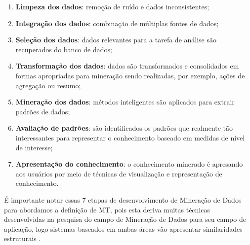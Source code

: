     \begin{enumerate}
        \item \textbf{Limpeza dos dados}: remoção de ruído e dados inconsistentes;
        \item \textbf{Integração dos dados}: combinação de múltiplas fontes de dados;
        \item \textbf{Seleção dos dados}: dados relevantes para a tarefa de análise são recuperados do banco de dados;
        \item \textbf{Transformação dos dados}: dados são transformados e consolidados em formas apropriadas para mineração sendo realizadas, por exemplo, ações de agregação ou resumo;
        \item \textbf{Mineração dos dados}: métodos inteligentes são aplicados para extrair padrões de dados;
        \item \textbf{Avaliação de padrões}: são identificados os padrões que realmente tão interessantes para representar o conhecimento baseado em medidas de nível de interesse;
        \item \textbf{Apresentação do conhecimento}: o conhecimento minerado é apresando aos usuários por meio de técnicas de visualização e representação de conhecimento.
    \end{enumerate}
    
    
    
    É importante notar essas 7 etapas de desenvolvimento de Mineração de Dados para abordamos a definição de MT, pois esta deriva muitas técnicas desenvolvidas na pesquisa do campo de Mineração de Dados para seu campo de aplicação, logo sistemas baseados em ambas áreas vão apresentar similaridades estruturais \cite[p.~1]{Feldman:2006:TMH:1076381}. 
    
    
    
